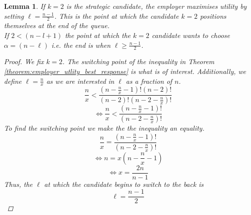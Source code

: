 \documentclass{article}
\newtheorem{lemma}{Lemma}
\begin{document}
\begin{lemma}\label{lemma:k=2_switching_point}
    If $k=2$ is the strategic candidate, the employer maximises utility by setting $\ell=\frac{n-1}{2}$. This is the point at which the candidate $k=2$ positions themselves at the end of the queue. \\
    
    If $2<(n-l+1)$ the point at which the $k=2$ candidate wants to choose $\alpha = (n-\ell)$ i.e. the end is when $ \ell \geq \frac{n-1}{2}$.
\begin{proof}
    We fix $k=2$. The switching point of the inequality in Theorem \ref{theorem:employer_utlity_best_response} is what is of interest. Additionally, we define $\ell = \frac{n}{x}$ as we are interested in $\ell$ as a fraction of $n$. 
    $$ \frac{n}{x} < \frac{(n-\frac{n}{x}-1)!(n-2)!}{(n-2)!(n-2-\frac{n}{x})!}$$
    $$ \iff \frac{n}{x} < \frac{(n-\frac{n}{x}-1)!}{(n-2-\frac{n}{x})!}$$
    To find the switching point we make the the inequality an equality.
    $$ \frac{n}{x} = \frac{(n-\frac{n}{x}-1)!}{(n-2-\frac{n}{x})!}$$
    $$ \iff n = x(n-\frac{n}{x}-1)$$
    $$ \iff x = \frac{2n}{n-1}$$
    Thus, the $\ell$ at which the candidate begins to switch to the back is 
    $$ \ell = \frac{n-1}{2}$$
\end{proof}
\end{lemma}
\end{document}
